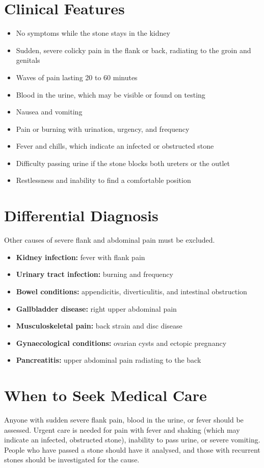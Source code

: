 \section*{Clinical Features}
\begin{itemize}
    \item No symptoms while the stone stays in the kidney
    \item Sudden, severe colicky pain in the flank or back, radiating to the groin and genitals
    \item Waves of pain lasting 20 to 60 minutes
    \item Blood in the urine, which may be visible or found on testing
    \item Nausea and vomiting
    \item Pain or burning with urination, urgency, and frequency
    \item Fever and chills, which indicate an infected or obstructed stone
    \item Difficulty passing urine if the stone blocks both ureters or the outlet
    \item Restlessness and inability to find a comfortable position
\end{itemize}

\section*{Differential Diagnosis}
Other causes of severe flank and abdominal pain must be excluded.
\begin{itemize}
    \item \textbf{Kidney infection:} fever with flank pain
    \item \textbf{Urinary tract infection:} burning and frequency
    \item \textbf{Bowel conditions:} appendicitis, diverticulitis, and intestinal obstruction
    \item \textbf{Gallbladder disease:} right upper abdominal pain
    \item \textbf{Musculoskeletal pain:} back strain and disc disease
    \item \textbf{Gynaecological conditions:} ovarian cysts and ectopic pregnancy
    \item \textbf{Pancreatitis:} upper abdominal pain radiating to the back
\end{itemize}

\section*{When to Seek Medical Care}
Anyone with sudden severe flank pain, blood in the urine, or fever should be assessed. Urgent care is needed for pain with fever and shaking (which may indicate an infected, obstructed stone), inability to pass urine, or severe vomiting. People who have passed a stone should have it analysed, and those with recurrent stones should be investigated for the cause.

